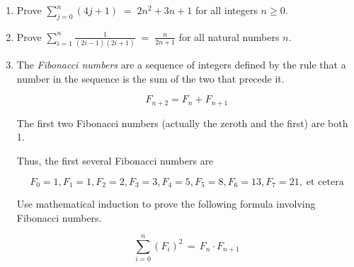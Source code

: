 \begin{enumerate}
\wbvfill


\item Prove $\displaystyle \sum_{j=0}^{n}(4j+1) \; = \; 2n^{2}+3n+1$ for all
integers $n \geq 0$.

\wbvfill

\workbookpagebreak

\item Prove $\displaystyle \sum_{i=1}^{n}\frac{1}{(2i-1)(2i+1)} \; = \; \frac{n}{2n+1}$ for all natural numbers $n$.

\wbvfill

\workbookpagebreak

\item The  \emph{Fibonacci numbers} are a sequence of integers defined by
the rule that a number in the sequence is the sum of the two that 
precede it.

\[ F_{n+2} = F_n + F_{n+1}  \]

\noindent The first two Fibonacci numbers (actually the zeroth and the first) 
are both 1.  

\noindent Thus, the first several Fibonacci numbers are

\[ F_0 = 1, F_1=1, F_2=2, F_3=3, F_4=5, F_5=8, F_6=13, F_7=21, \; \mbox{et cetera} \]

Use mathematical induction to prove the following formula involving
Fibonacci numbers.

\[ \sum_{i=0}^n (F_i)^2 \, = \, F_n \cdot F_{n+1} \]

\wbvfill

\workbookpagebreak

\end{enumerate}



